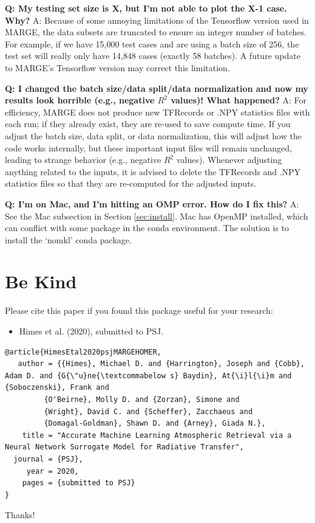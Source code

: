 \documentclass[letterpaper, 12pt]{article}
\begin{document}
\noindent \textbf{Q: My testing set size is X, but I'm not able to plot 
the X-1 case.  Why?}  A: Because of some annoying limitations of the Tensorflow 
version used in MARGE, the data subsets are truncated to ensure an integer 
number of batches.  For example, if we have 15,000 test cases and are using a 
batch size of 256, the test set will really only have 14,848 cases (exactly 58 
batches).  A future update to MARGE's Tensorflow version may correct this 
limitation. \newline

\noindent \textbf{Q: I changed the batch size/data split/data normalization 
and now my results look horrible (e.g., negative $R^2$ values)!  What 
happened?}  A: For efficiency, MARGE 
does not produce new TFRecords or .NPY statistics files with each run; if 
they already exist, they are re-used to save compute time.  If you adjust the 
batch size, data split, or data normalization, this will adjust how the code 
works internally, but these important input files will remain unchanged, leading 
to strange behavior (e.g., negative $R^2$ values).  Whenever adjusting anything 
related to the inputs, it is advised to delete the TFRecords and .NPY statistics
files so that they are re-computed for the adjusted inputs. \newline

\noindent \textbf{Q: I'm on Mac, and I'm hitting an OMP error.  How do 
I fix this?}  A: See the Mac subsection in Section \ref{sec:install}.  Mac has 
OpenMP installed, which can conflict with some package in the conda 
environment.  The solution is to install the `nomkl' conda package.  


\section{Be Kind}
\label{sec:bekind}
Please cite this paper if you found this package useful for your research:

\begin{itemize}
\item Himes et al. (2020), submitted to PSJ.
\end{itemize}

\begin{verbatim}
@article{HimesEtal2020psjMARGEHOMER,
   author = {{Himes}, Michael D. and {Harrington}, Joseph and {Cobb}, Adam D. and {G{\"u}ne{\textcommabelow s} Baydin}, At{\i}l{\i}m and {Soboczenski}, Frank and
         {O'Beirne}, Molly D. and {Zorzan}, Simone and
         {Wright}, David C. and {Scheffer}, Zacchaeus and
         {Domagal-Goldman}, Shawn D. and {Arney}, Giada N.},
    title = "Accurate Machine Learning Atmospheric Retrieval via a Neural Network Surrogate Model for Radiative Transfer",
  journal = {PSJ},
     year = 2020,
    pages = {submitted to PSJ}
}
\end{verbatim}

\noindent Thanks!


\end{document}
